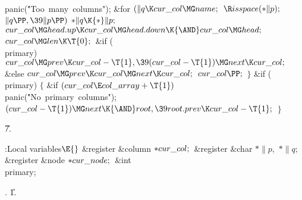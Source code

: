 \\{panic}(\.{"Too\ many\ columns"});\2\6
\&{for} ${}(\|q\K\\{cur\_col}\MG\\{name};{}$ ${}\R\\{isspace}({*}\|p);{}$ ${}%
\|q\PP,\39\|p\PP){}$\1\5
${}{*}\|q\K{*}\|p;{}$\2\6
${}\\{cur\_col}\MG\\{head}.\\{up}\K\\{cur\_col}\MG\\{head}.\\{down}\K{\AND}%
\\{cur\_col}\MG\\{head};{}$\6
${}\\{cur\_col}\MG\\{len}\K\T{0};{}$\6
\&{if} (\\{primary})\1\5
${}\\{cur\_col}\MG\\{prev}\K\\{cur\_col}-\T{1},\39(\\{cur\_col}-\T{1})\MG%
\\{next}\K\\{cur\_col};{}$\2\6
\&{else}\1\5
${}\\{cur\_col}\MG\\{prev}\K\\{cur\_col}\MG\\{next}\K\\{cur\_col};{}$\2\6
${}\\{cur\_col}\PP;{}$\6
\4${}\}{}$\2\6
\&{if} (\\{primary})\5
${}\{{}$\1\6
\&{if} ${}(\\{cur\_col}\E\\{col\_array}+\T{1}){}$\1\5
\\{panic}(\.{"No\ primary\ columns"});\2\6
${}(\\{cur\_col}-\T{1})\MG\\{next}\K{\AND}\\{root},\39\\{root}.\\{prev}\K\\{cur%
\_col}-\T{1};{}$\6
\4${}\}{}$\2\par
\U7.\fi

\B{}:Local variables\X${}\E{}$\6
\&{register} \&{column} ${}{*}\\{cur\_col};{}$\6
\&{register} \&{char} ${}{*}\|p,{}$ ${}{*}\|q;{}$\6
\&{register} \&{node} ${}{*}\\{cur\_node};{}$\6
\&{int} \\{primary};\par
{}.
\U1.\fi

